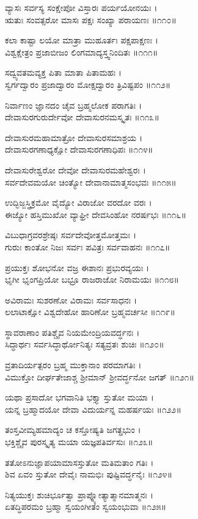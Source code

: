 ವ್ಯಾಸಃ ಸರ್ವಸ್ಯ ಸಂಕ್ಷೇಪೋ ವಿಸ್ತಾರಃ ಪರ್ಯಯೋನಯಃ ।\\
ಋತುಃ ಸಂವತ್ಸರೋ ಮಾಸಃ ಪಕ್ಷಃ ಸಂಖ್ಯಾ ಪರಾಯಣಃ ॥೧೧೦॥

ಕಲಾ ಕಾಷ್ಟಾ ಲಯೋ ಮಾತ್ರಾ ಮುಹೂರ್ತಃ ಪಕ್ಷಪಾಕ್ಷಣಃ ।\\
ವಿಶ್ವಕ್ಷೇತ್ರಂ ಪ್ರಜಾಬೀಜಂ ಲಿಂಗಮಾದ್ಯಸ್ತ್ವನಿಂದಿತಃ ॥೧೧೧॥

ಸದ್ವ್ಯವತಮವ್ಯಕ್ತ ಪಿತಾ ಮಾತಾ ಪಿತಾಮಹಃ ।\\
ಸ್ವರ್ಗದ್ವಾರಂ ಪ್ರಜಾದ್ವಾರಂ ಮೋಕ್ಷದ್ವಾರಂ ತ್ರಿವಿಷ್ಟಪಂ ॥೧೧೨॥

ನಿರ್ವಾಣಂ ಜ್ಞಾನದಂ ಚೈವ ಬ್ರಹ್ಮಲೋಕ ಪರಾಗತಿಃ ।\\
ದೇವಾಸುರಗುರುರ್ದೇವೋ ದೇವಾಸುರನಮಸ್ಕೃತಃ ॥೧೧೩॥

ದೇವಾಸುರಮಹಾಮಾತ್ರೋ ದೇವಾಸುರಸಮಾಶ್ರಯ ।\\
ದೇವಾಸುರಗಣಾಧ್ಯಕ್ಷೋ ದೇವಾಸುರಗಣಾಧಿಪಃ ॥೧೧೪॥

ದೇವಾಸುರೇಶ್ವರೋ ದೇವೋ ದೇವಾಸುರಮಹೇಶ್ವರಃ ।\\
ಸರ್ವದೇವಮಯೋ ಚಿಂತ್ಯೋ ದೇವಾನಾಮಾತ್ಮಸಂಭವಃ ॥೧೧೫॥

ಉದ್ಭಿಜ್ಜಸ್ತ್ರಿಕ್ರಮೋ ವೈದ್ಯೋ ವಿರಾಜೋ ವರದೋ ವರಃ ।\\
ಈಜ್ಯೋ ಹಸ್ತಿಮುಖೋ ವ್ಯಾಘ್ರೀ ದೇವಸಿಂಹೋ ನರರ್ಷಭಃ ॥೧೧೬॥

ವಿಬುಧಾಗ್ರವರಶ್ರೇಷ್ಠಃ ಸರ್ವದೇವೋತ್ತಮೋತ್ತಮಃ ।\\
ಗುರುಃ ಕಾಂತೋ ನಿಜಃ ಸರ್ವಃ ಪವಿತ್ರಃ ಸರ್ವವಾಹನಃ ॥೧೧೭॥

ಪ್ರಯುಕ್ತಃ ಶೋಭನೋ ವಜ್ರ ಈಶಾನಃ ಪ್ರಭುರವ್ಯಯಃ ।\\
ಭೃಗೀ ಭೃಂಗಪ್ರಿಯೋ ಬಭ್ರೂ ರಾಜರಾಜೋ ನಿರಾಮಯಃ ॥೧೧೮॥

ಅವಿರಾಮಃ ಸುಶರಣೋ ವಿರಾಮಃ ಸರ್ವಸಾಧನಃ ।\\
ಲಲಾಟಾಕ್ಷೋ ವಿಶ್ವದೇಹೋ ಹಾರಿಣೋ ಬ್ರಹ್ಮವರ್ಚಸೀ ॥೧೧೯॥

ಸ್ಥಾವರಾಣಾಂ ಪತಿಶ್ಚೈವ ನಿಯಮೇಂದ್ರಿಯವರ್ದ್ಧನಃ ।\\
ಸಿದ್ಧಾರ್ಥಃ ಸರ್ವಸಿದ್ಧಾರ್ಥೋನಿತ್ಯಃ ಸತ್ಯವ್ರತಃ ಶುಚಿಃ ॥೧೨೦॥

ವ್ರತಾದಿರ್ಯತ್ಪರಂ ಬ್ರಹ್ಮ ಮುಕ್ತಾನಾಂ ಪರಮಾಗತಿಃ ।\\
ವಿಮುಕ್ತೋ ದೀರ್ಘತೇಜಾಶ್ಚ ಶ್ರೀಮಾನ್ ಶ್ರೀವರ್ದ್ಧನೋ ಜಗತ್ ॥೧೨೧॥

ಯಥಾ ಪ್ರಸಾದೋ ಭಗವಾನಿತಿ ಭಕ್ತ್ಯಾ ಸ್ತುತೋ ಮಯಾ ।\\
ಯನ್ನ ಬ್ರಹ್ಮಾದಯೋ ದೇವಾ ವಿದುರ್ಯನ್ನ ಮಹರ್ಷಯಃ ॥೧೨೨॥

ತಂಸ್ತವೀಮ್ಯಹಮಾದ್ಯಂ ಚ ಕಸ್ತೋಷ್ಯತಿ ಜಗತ್ಪ್ರಭುಂ ।\\
ಭಕ್ತಿಶ್ಚೈವ ಪುರಸ್ಕೃತ್ಯ ಮಯಾ ಯಜ್ಞಪತಿರ್ವಸುಃ ॥೧೨೩॥

ತತೋಽನುಜ್ಞಾಪಯಾಮಾಸಸ್ತುತೋ ಮತಿಮತಾಂ ಗತಿಃ ।\\
ಶಿವ ಏವಂ ಸ್ತುತೋ ದೇವೈಃ ನಾಮಭಿಃ ಪುಷ್ಟಿವರ್ದ್ಧನೈಃ ॥೧೨೪॥

ನಿತ್ಯಯುಕ್ತಃ ಶುಚಿರ್ಭೂತ್ವಾ ಪ್ರಾಪ್ನ್ಯೋತ್ಯಾತ್ಮಾನಮಾತ್ಮನಃ ।\\
ಏತದ್ಧಿಪರಮಂ ಬ್ರಹ್ಮಾ ಸ್ವಯಂಗೀತಂ ಸ್ವಯಂಭುವಾ ॥೧೨೫॥

